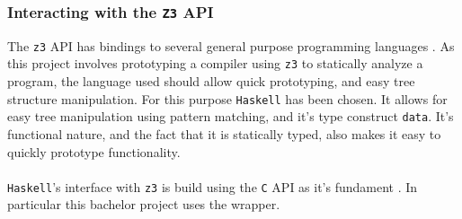 \subsubsection{Interacting with the \texttt{Z3} API}
The \texttt{z3} API has bindings to several general purpose programming languages \cite{z3:api}.
As this project involves prototyping a compiler using \texttt{z3} to statically analyze a program,
the language used should allow quick prototyping, and easy tree structure manipulation. For this
purpose \texttt{Haskell} has been chosen. It allows for easy tree manipulation using pattern
matching, and it's type construct \texttt{data}. It's functional nature, and the fact that it is
statically typed, also makes it easy to quickly prototype functionality.
\\
\\
\texttt{Haskell}'s interface with \texttt{z3} is build using the \texttt{C} API as it's fundament
\cite{z3:api2}. In particular this bachelor project uses the  wrapper.


